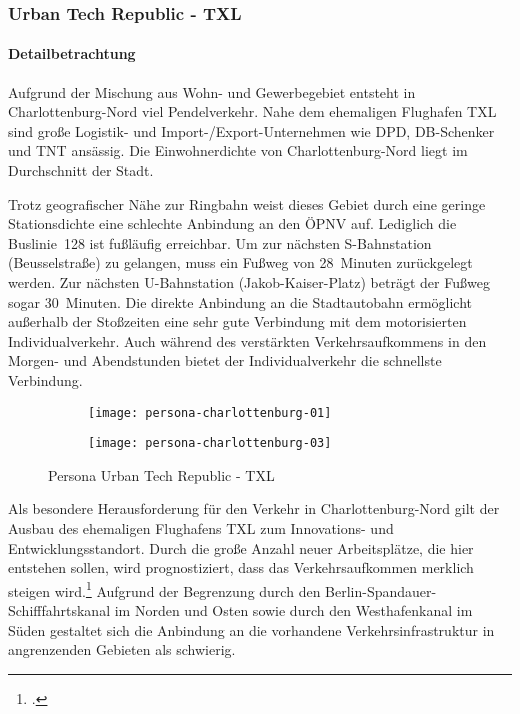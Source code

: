 \subsubsection{Urban Tech Republic - TXL}

\paragraph{Detailbetrachtung}

Aufgrund der Mischung aus Wohn- und Gewerbegebiet entsteht in Charlottenburg-Nord viel Pendelverkehr. Nahe dem ehemaligen Flughafen TXL sind große Logistik- und Import-/Export-Unternehmen wie DPD, DB-Schenker und TNT ansässig. Die Einwohnerdichte von Charlottenburg-Nord liegt im Durchschnitt der Stadt.

Trotz geografischer Nähe zur Ringbahn weist dieses Gebiet durch eine geringe Stationsdichte eine schlechte Anbindung an den ÖPNV auf. Lediglich die Buslinie~128 ist fußläufig erreichbar. Um zur nächsten S-Bahnstation (Beusselstraße) zu gelangen, muss ein Fußweg von 28~Minuten zurückgelegt werden. Zur nächsten U-Bahnstation (Jakob-Kaiser-Platz) beträgt der Fußweg sogar 30~Minuten. Die direkte Anbindung an die Stadtautobahn ermöglicht außerhalb der Stoßzeiten eine sehr gute Verbindung mit dem motorisierten Individualverkehr. Auch während des verstärkten Verkehrsaufkommens in den Morgen- und Abendstunden bietet der Individualverkehr die schnellste Verbindung.

\begin{figure}
    \centering
    \begin{subfigure}{.5\textwidth}
        \centering
        \texttt{[image: persona-charlottenburg-01]}
    \end{subfigure}%
    \begin{subfigure}{.5\textwidth}
        \centering
        \texttt{[image: persona-charlottenburg-03]}
    \end{subfigure}
    \caption{Persona Urban Tech Republic - TXL}
    \label{persona-charlottenburg-nord}
\end{figure}

Als besondere Herausforderung für den Verkehr in Charlottenburg-Nord gilt der Ausbau des ehemaligen Flughafens TXL zum Innovations- und Entwicklungsstandort. Durch die große Anzahl neuer Arbeitsplätze, die hier entstehen sollen, wird prognostiziert, dass das Verkehrsaufkommen merklich steigen wird.\footcite{UrbanTechRepublic} Aufgrund der Begrenzung durch den Berlin-Spandauer-Schifffahrtskanal im Norden und Osten sowie durch den Westhafenkanal im Süden gestaltet sich die Anbindung an die vorhandene Verkehrsinfrastruktur in angrenzenden Gebieten als schwierig.

